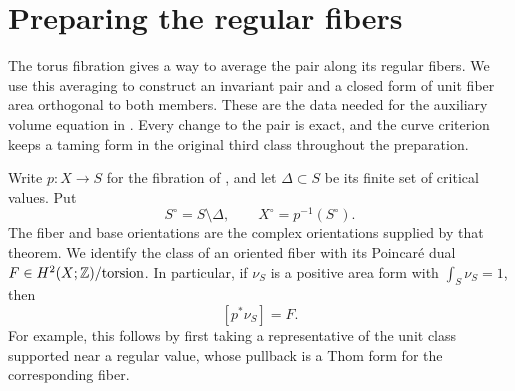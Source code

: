 \section{Preparing the regular fibers}\label{sec:regular-preparation}

The torus fibration gives a way to average the pair along its regular
fibers.  We use this averaging to construct an invariant pair and a
closed form of unit fiber area orthogonal to both members.  These are
the data needed for the auxiliary volume equation in
.  Every change to the pair is exact, and the
curve criterion keeps a taming form in the original third class
throughout the preparation.

Write $p\colon X\to S$ for the fibration of , and let
$\Delta\subset S$ be its finite set of critical values.  Put
\[
 S^\circ=S\setminus\Delta,
 \qquad X^\circ=p^{-1}(S^\circ).
\]
The fiber and base orientations are the complex orientations supplied by
that theorem.  We identify the class of an oriented fiber with its
Poincar\'e dual $F\in H^2(X;\mathbb Z)/\mathrm{torsion}$.  In particular, if
$\nu_S$ is a positive area form with $\int_S\nu_S=1$, then
\begin{equation}\label{eq:regular-basic-class}
 [p^*\nu_S]=F.
\end{equation}
For example, this follows by first taking a representative of the unit
class supported near a regular value, whose pullback is a Thom form for
the corresponding fiber.

